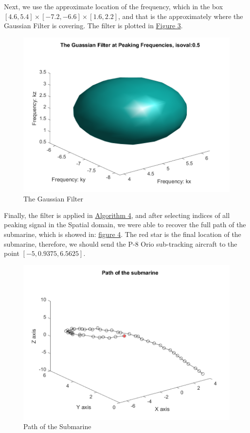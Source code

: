 \documentclass{article}
\begin{document}
    Next, we use the approximate location of the frequency, which in the box $[4.6, 5.4]\times [-7.2, -6.6]\times[1.6, 2.2]$, and that is the approximately where the Gaussian Filter is covering. The filter is plotted in \hyperref[fig:guass-filter]{Figure 3}. 
    
    \begin{figure}[h]
        \centering
        \includegraphics*[width=0.5\linewidth]{gaussian-filter.png}
        \caption{The Gaussian Filter}
        \label{fig:guass-filter}
    \end{figure}

    \par
    Finally, the filter is applied in \hyperref[alg:algorithm4]{Algorithm 4}, and after selecting indices of all peaking signal in the Spatial domain, we were able to recover the full path of the submarine, which is showed in: \hyperref[fig:path]{figure 4}. The red star is the final location of the submarine, therefore, we should send the P-8 Orio sub-tracking aircraft to the point $[-5, 0.9375, 6.5625]$.

    \begin{figure}[h]
        \centering
        \includegraphics*[width=0.7\linewidth]{submarine-path.png}
        \caption{Path of the Submarine}
        \label{fig:path}
        \centering
    \end{figure}
\end{document}
